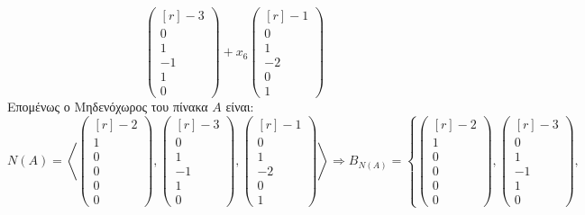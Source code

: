 \documentclass[a4paper,table]{report}
\begin{document}
\begin{myitemize}[leftmargin=*]
\[      \begin{pmatrix*}[r] -3 \\ 0 \\ 1 \\ -1 \\ 1 \\ 0  \end{pmatrix*} 
      + x_{6} 
      \begin{pmatrix*}[r] -1 \\ 0 \\ 1 \\ -2 \\ 0 \\ 1  \end{pmatrix*} \!\!
    \] 
    Επομένως ο Μηδενόχωρος του πίνακα $A$ είναι:
    \[
      N(A) = \left< 
      \begin{pmatrix*}[r] -2 \\ 1 \\ 0 \\ 0 \\ 0 \\ 0  \end{pmatrix*}, 
      \begin{pmatrix*}[r] -3 \\ 0 \\ 1 \\ -1 \\ 1 \\ 0  \end{pmatrix*}, 
      \begin{pmatrix*}[r] -1 \\ 0 \\ 1 \\ -2 \\ 0 \\ 1 \end{pmatrix*} \right> 
      \Rightarrow B_{N(A)} = \left\{  
        \begin{pmatrix*}[r] -2 \\ 1 \\ 0 \\ 0 \\ 0 \\ 0  \end{pmatrix*}, 
        \begin{pmatrix*}[r] -3 \\ 0 \\ 1 \\ -1 \\ 1 \\ 0  \end{pmatrix*}, 
\]
\end{myitemize}
\end{document}

